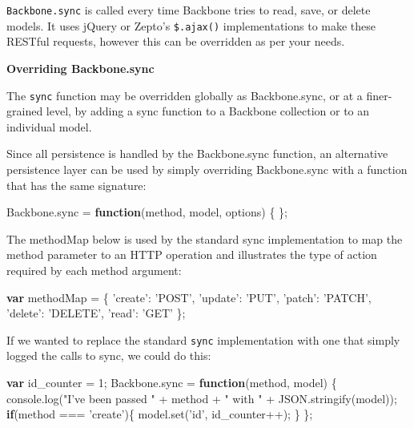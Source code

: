 \documentclass[9pt]{book}
\newenvironment{Shaded}{}{}
\newcommand{\KeywordTok}[1]{\textcolor[rgb]{0.00,0.44,0.13}{\textbf{{#1}}}}
\newcommand{\DecValTok}[1]{\textcolor[rgb]{0.25,0.63,0.44}{{#1}}}
\newcommand{\StringTok}[1]{\textcolor[rgb]{0.25,0.44,0.63}{{#1}}}
\newcommand{\OtherTok}[1]{\textcolor[rgb]{0.00,0.44,0.13}{{#1}}}
\newcommand{\FunctionTok}[1]{\textcolor[rgb]{0.02,0.16,0.49}{{#1}}}
\newcommand{\NormalTok}[1]{{#1}}
\begin{document}
\texttt{Backbone.sync} is called every time Backbone tries to read,
save, or delete models. It uses jQuery or Zepto's \texttt{\$.ajax()}
implementations to make these RESTful requests, however this can be
overridden as per your needs.

\textbf{Overriding Backbone.sync}

The \texttt{sync} function may be overridden globally as Backbone.sync,
or at a finer-grained level, by adding a sync function to a Backbone
collection or to an individual model.

Since all persistence is handled by the Backbone.sync function, an
alternative persistence layer can be used by simply overriding
Backbone.sync with a function that has the same signature:

\begin{Shaded}
\begin{Highlighting}[]
\OtherTok{Backbone}\NormalTok{.}\FunctionTok{sync} \NormalTok{= }\KeywordTok{function}\NormalTok{(method, model, options) \{}
\NormalTok{\};}
\end{Highlighting}
\end{Shaded}

The methodMap below is used by the standard sync implementation to map
the method parameter to an HTTP operation and illustrates the type of
action required by each method argument:

\begin{Shaded}
\begin{Highlighting}[]
\KeywordTok{var} \NormalTok{methodMap = \{}
  \StringTok{'create'}\NormalTok{: }\StringTok{'POST'}\NormalTok{,}
  \StringTok{'update'}\NormalTok{: }\StringTok{'PUT'}\NormalTok{,}
  \StringTok{'patch'}\NormalTok{:  }\StringTok{'PATCH'}\NormalTok{,}
  \StringTok{'delete'}\NormalTok{: }\StringTok{'DELETE'}\NormalTok{,}
  \StringTok{'read'}\NormalTok{:   }\StringTok{'GET'}
\NormalTok{\};}
\end{Highlighting}
\end{Shaded}

If we wanted to replace the standard \texttt{sync} implementation with
one that simply logged the calls to sync, we could do this:

\begin{Shaded}
\begin{Highlighting}[]
\KeywordTok{var} \NormalTok{id_counter = }\DecValTok{1}\NormalTok{;}
\OtherTok{Backbone}\NormalTok{.}\FunctionTok{sync} \NormalTok{= }\KeywordTok{function}\NormalTok{(method, model) \{}
  \OtherTok{console}\NormalTok{.}\FunctionTok{log}\NormalTok{(}\StringTok{"I've been passed "} \NormalTok{+ method + }\StringTok{" with "} \NormalTok{+ }\OtherTok{JSON}\NormalTok{.}\FunctionTok{stringify}\NormalTok{(model));}
  \KeywordTok{if}\NormalTok{(method === }\StringTok{'create'}\NormalTok{)\{ }\OtherTok{model}\NormalTok{.}\FunctionTok{set}\NormalTok{(}\StringTok{'id'}\NormalTok{, id_counter++); \}}
\NormalTok{\};}
\end{Highlighting}
\end{Shaded}
\end{document}

